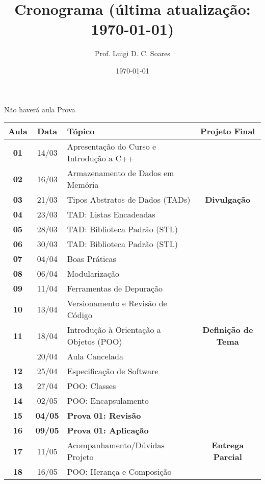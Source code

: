 \documentclass[11pt]{article}
\author{Prof. Luigi D. C. Soares}
\date{\today}
\title{Cronograma (\color{red}\bfseries última atualização: \today\color{black})}
\begin{document}
\begin{center}
    \Large\bfseries\thetitle{}
\end{center}

\begin{center}
    \quad Não haverá aula \qquad
    \quad Prova
\end{center}

\begin{center}
\begin{tabular}{>{\bfseries}ccl>{\bfseries}c}
\toprule
\textbf{Aula} & \textbf{Data} & \textbf{Tópico} & \textbf{Projeto Final}\\[0pt]
\midrule
01 & 14/03 & Apresentação do Curso e Introdução a C++ & \\[0pt]
02 & 16/03 & Armazenamento de Dados em Memória & \\[0pt]
03 & 21/03 & Tipos Abstratos de Dados (TADs) & Divulgação\\[0pt]
04 & 23/03 & TAD: Listas Encadeadas & \\[0pt]
05 & 28/03 & TAD: Biblioteca Padrão (STL) & \\[0pt]
06 & 30/03 & TAD: Biblioteca Padrão (STL) & \\[0pt]
07 & 04/04 & Boas Práticas & \\[0pt]
08 & 06/04 & Modularização & \\[0pt]
09 & 11/04 & Ferramentas de Depuração & \\[0pt]
10 & 13/04 & Versionamento e Revisão de Código & \\[0pt]
11 & 18/04 & Introdução à Orientação a Objetos (POO) & Definição de Tema\\[0pt]
\rowcolor{green!40} & 20/04 & Aula Cancelada & \\[0pt]
12 & 25/04 & Especificação de Software & \\[0pt]
13 & 27/04 & POO: Classes & \\[0pt]
14 & 02/05 & POO: Encapsulamento & \\[0pt]
\rowcolor{yellow!50} 15 & \textbf{04/05} & \textbf{Prova 01: Revisão} & \\[0pt]
\rowcolor{yellow!50} 16 & \textbf{09/05} & \textbf{Prova 01: Aplicação} & \\[0pt]
17 & 11/05 & Acompanhamento/Dúvidas Projeto & Entrega Parcial\\[0pt]
18 & 16/05 & POO: Herança e Composição & \\[0pt]

\end{tabular}
\end{center}
\end{document}
